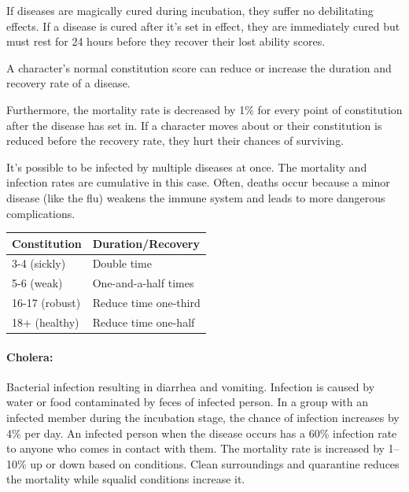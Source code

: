 \begin{multicols}{2}
If diseases are magically cured during incubation, they suffer no debilitating effects.  If a disease is cured after it's set in effect, they are immediately cured but must rest for 24 hours before they recover their lost ability scores.

A character's normal constitution score can reduce or increase the duration and recovery rate of a disease.

Furthermore, the mortality rate is decreased by 1\% for every point of constitution after the disease has set in.  If a character moves about or their constitution is reduced before the recovery rate, they hurt their chances of surviving.

It's possible to be infected by multiple diseases at once.  The mortality and infection rates are cumulative in this case.  Often, deaths occur because a minor disease (like the flu) weakens the immune system and leads to more dangerous complications.

\noindent
\begin{minipage}{\columnwidth}

\label{conrecrate}
\noindent
\begin{tabular}{|p{}|p{}|}
\hline
Constitution	& Duration/Recovery \\
\hline\hline
\rowcolor[gray]{.9}3-4 (sickly)	& Double time \\
5-6 (weak)		& One-and-a-half times \\
\rowcolor[gray]{.9}16-17 (robust)	& Reduce time one-third \\
18+ (healthy)	& Reduce time one-half \\
\hline
\end{tabular}

\end{minipage}

\paragraph{Cholera:} Bacterial infection resulting in diarrhea and vomiting.  Infection is caused by water or food contaminated by feces of infected person.  In a group with an infected member during the incubation stage, the chance of infection increases by 4\% per day.  An infected person when the disease occurs has a 60\% infection rate to anyone who comes in contact with them.  The mortality rate is increased by 1--10\% up or down based on conditions.  Clean surroundings and quarantine reduces the mortality while squalid conditions increase it.


\end{multicols}
